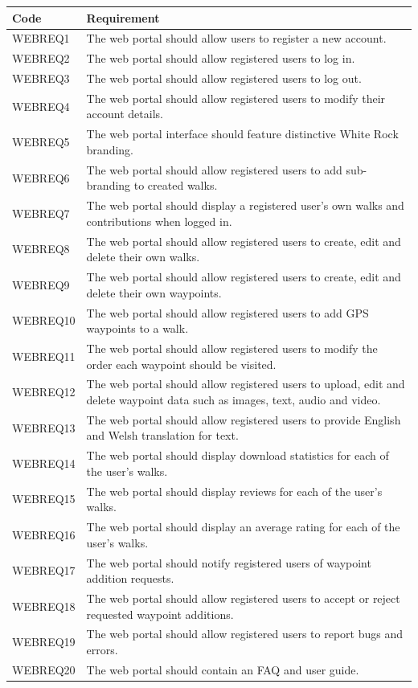\documentclass[11pt,a4paper]{article}
\begin{document}
\begin{longtable}{|p{2.5cm}p{13cm}|}
\hline
\textbf{Code} & \textbf{Requirement} \\
\hline
WEBREQ1 & The web portal should allow users to register a new account. \\ \hline
WEBREQ2 & The web portal should allow registered users to log in. \\ \hline
WEBREQ3 & The web portal should allow registered users to log out. \\ \hline
WEBREQ4 & The web portal should allow registered users to modify their account details. \\ \hline
WEBREQ5 & The web portal interface should feature distinctive White Rock branding. \\ \hline
WEBREQ6 & The web portal should allow registered users to add sub-branding to created walks. \\ \hline
WEBREQ7 & The web portal should display a registered user's own walks and contributions when logged in. \\ \hline
WEBREQ8 & The web portal should allow registered users to create, edit and delete their own walks. \\ \hline
WEBREQ9 & The web portal should allow registered users to create, edit and delete their own waypoints. \\ \hline
WEBREQ10 & The web portal should allow registered users to add GPS waypoints to a walk. \\ \hline
WEBREQ11 & The web portal should allow registered users to modify the order each waypoint should be visited. \\ \hline
WEBREQ12 & The web portal should allow registered users to upload, edit and delete waypoint data such as images, text, audio and video. \\ \hline
WEBREQ13 & The web portal should allow registered users to provide English and Welsh translation for text. \\ \hline
WEBREQ14 & The web portal should display download statistics for each of the user's walks. \\ \hline
WEBREQ15 & The web portal should display reviews for each of the user's walks. \\ \hline
WEBREQ16 & The web portal should display an average rating for each of the user's walks. \\ \hline
WEBREQ17 & The web portal should notify registered users of waypoint addition requests. \\ \hline
WEBREQ18 & The web portal should allow registered users to accept or reject requested waypoint additions. \\ \hline
WEBREQ19 & The web portal should allow registered users to report bugs and errors. \\ \hline
WEBREQ20 & The web portal should contain an FAQ and user guide. \\ \hline
\end{longtable}
\end{document}
